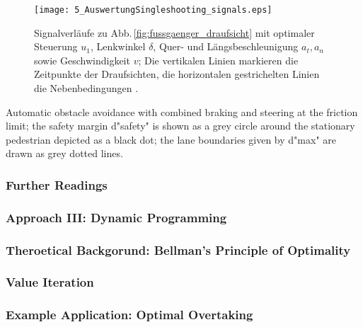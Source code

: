 \begin{figure}	
\centering
	\def\xlabel{$t$ in $\unit{s}$}
	\def\ylabelA{$v$ in $\unitfrac{m}{s}$}	
	\def\ylabelB{$\delta$ in $\unit{rad}$}	
	\def\ylabelC{$u_1$ in $\unitfrac{rad}{s}$}
	\def\ylabelD{$a_t$ in $\unitfrac{m}{s^2}$}	
	\def\ylabelE{$a_n$ in $\unitfrac{m}{s^2}$}
	
	\renewcommand{\matlabtextA}{\normalsize }
  \texttt{[image: 5\_AuswertungSingleshooting\_signals.eps]}
    \caption[Signalverläufe bei kombiniertem Bremsen und Ausweichen]{Signalverläufe zu Abb.\,\ref{fig:fussgaenger_draufsicht} mit optimaler Steuerung $u_1$, Lenkwinkel $\delta$,  Quer- und Längsbeschleunigung $a_t, a_n$ sowie Geschwindigkeit $v$; Die vertikalen Linien markieren die Zeitpunkte der Draufsichten, die horizontalen gestrichelten Linien die Nebenbedingungen \cite{werling2012cdc}.}
    \label{fig:fussgaenger_draufsicht_signale}
\end{figure}
	


Automatic obstacle avoidance with combined braking and steering at the friction limit; the safety margin d"safety"  is shown as a grey circle around the stationary pedestrian depicted as a black dot; the lane boundaries given by d"max"  are drawn as grey dotted lines.

\subsubsection{Further Readings}\label{S:57.3.2.3}

\subsubsection{Approach III: Dynamic Programming}\label{S:57.3.3}
\subsubsection{Theroetical Backgorund: Bellman’s Principle of Optimality}\label{S:57.3.3.1}

\subsubsection{Value Iteration}\label{57.3.3.2}

\subsubsection{Example Application: Optimal Overtaking}\label{S:57.3.3.3}

